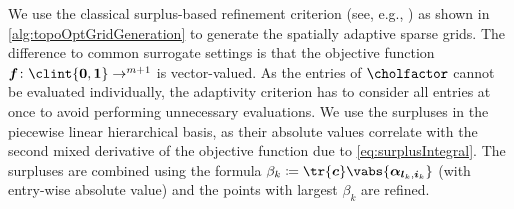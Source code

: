 We use the classical surplus-based refinement criterion
(see, e.g., \cite{Pflueger10Spatially})
as shown in \cref{alg:topoOptGridGeneration}
to generate the spatially adaptive sparse grids.
The difference to common surrogate settings is that the objective function
$\*f\colon \clint{\*0, \*1} \to \real^{m+1}$ is vector-valued.
As the entries of $\cholfactor$ cannot be evaluated individually,
the adaptivity criterion has to consider all entries at once
to avoid performing unnecessary evaluations.
We use the surpluses in the piecewise linear hierarchical basis,
as their absolute values correlate with the second mixed derivative
of the objective function due to \cref{eq:surplusIntegral}.
The surpluses are combined using the formula
$\beta_k \ceq \tr{\*c} \vabs{\vsurplus_{\*l_k,\*i_k}}$
(with entry-wise absolute value) and the
points with largest $\beta_k$ are refined.

